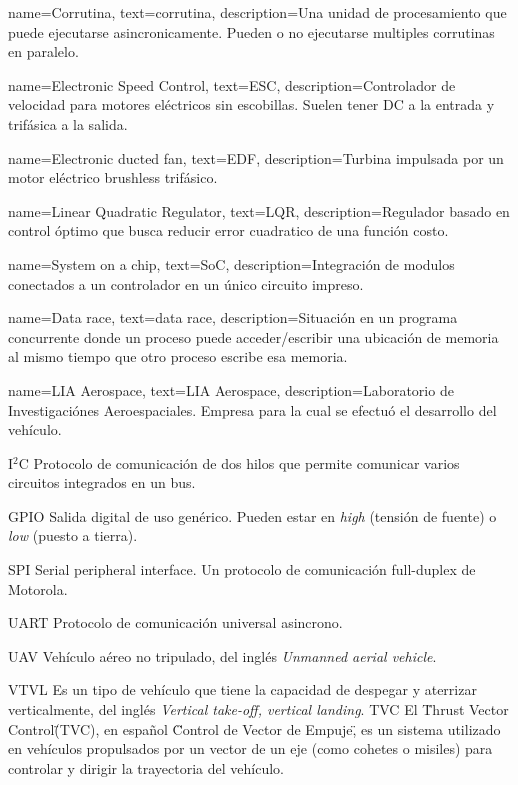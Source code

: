 \usepackage[sort=none,abbreviations]{glossaries-extra}

{
	name=Corrutina,
    text=corrutina,
	description={Una unidad de procesamiento que puede ejecutarse asincronicamente. Pueden o no ejecutarse multiples corrutinas en paralelo.}
}

{
	name=Electronic Speed Control,
	text=ESC,
	description={Controlador de velocidad para motores eléctricos sin escobillas. Suelen tener DC a la entrada y trifásica a la salida.}
}

{
	name=Electronic ducted fan,
	text=EDF,
	description={Turbina impulsada por un motor eléctrico brushless trifásico.}
}

{
	name=Linear Quadratic Regulator,
	text=LQR,
	description={Regulador basado en control óptimo que busca reducir error cuadratico de una función costo.}
}

{
	name=System on a chip,
	text=SoC,
	description={Integración de modulos conectados a un controlador en un único circuito impreso.}
}

{
	name=Data race,
	text=data race,
	description={Situación en un programa concurrente donde un proceso puede acceder/escribir una ubicación de memoria al mismo tiempo que otro proceso escribe esa memoria.}
}

{
	name=LIA Aerospace,
	text=LIA Aerospace,
	description={Laboratorio de Investigaciónes Aeroespaciales. Empresa para la cual se efectuó el desarrollo del vehículo.}
}

{I$^2$C}
{Protocolo de comunicación de dos hilos que permite comunicar varios circuitos integrados en un bus.}

{GPIO}
{Salida digital de uso genérico. Pueden estar en \emph{high} (tensión de fuente) o \emph{low} (puesto a tierra).}

{SPI}
{Serial peripheral interface. Un protocolo de comunicación full-duplex de Motorola.}

{UART}
{Protocolo de comunicación universal asincrono.}

{UAV}
{Vehículo aéreo no tripulado, del inglés \textit{Unmanned aerial vehicle}.}

{VTVL}
{Es un tipo de vehículo que tiene la capacidad de despegar y aterrizar verticalmente, del inglés \textit{Vertical take-off, vertical landing}.}
{TVC}
{El \"Thrust Vector Control\" (TVC), en español \"Control de Vector de Empuje\", es un sistema utilizado en vehículos propulsados por un vector de un eje (como cohetes o misiles) para controlar y dirigir la trayectoria del vehículo.}



